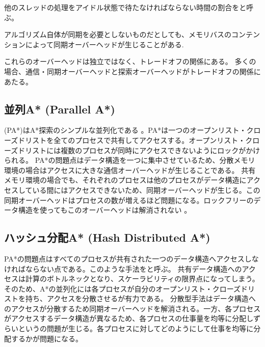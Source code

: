 {
  他のスレッドの処理をアイドル状態で待たなければならない時間の割合をと呼ぶ。
}

アルゴリズム自体が同期を必要としないものだとしても、メモリバスのコンテンションによって同期オーバーヘッドが生じることがある\cite{burnslrz10,kishimotofb13}.


これらのオーバーヘッドは独立ではなく、トレードオフの関係にある。
多くの場合、通信・同期オーバーヘッドと探索オーバーヘッドがトレードオフの関係にあたる。


\subsection{並列A* (Parallel A*)}

 (PA*)はA*探索のシンプルな並列化である \cite{iranis86}。PA*は一つのオープンリスト・クローズドリストを全てのプロセスで共有してアクセスする。オープンリスト・クローズドリストには複数のプロセスが同時にアクセスできないようにロックがかけられる。
PA*の問題点はデータ構造を一つに集中させているため、分散メモリ環境の場合はアクセスに大きな通信オーバーヘッドが生じることである。
共有メモリ環境の場合でも、それぞれのプロセスは他のプロセスがデータ構造にアクセスしている間にはアクセスできないため、同期オーバーヘッドが生じる。この同期オーバーヘッドはプロセスの数が増えるほど問題になる。ロックフリーのデータ構造を使ってもこのオーバーヘッドは解消されない \cite{burnslrz10}。

\subsection{ハッシュ分配A* (Hash Distributed A*)}
\label{sec:hash-distributed-astar}

PA*の問題点はすべてのプロセスが共有された一つのデータ構造へアクセスしなければならない点である。このような手法をと呼ぶ。
共有データ構造へのアクセスは計算のボトルネックとなり、スケーラビリティの限界点になってしまう。
そのため、A*の並列化には各プロセスが自分のオープンリスト・クローズドリストを持ち、アクセスを分散させるが有力である。
分散型手法はデータ構造へのアクセスが分散するため同期オーバーヘッドを解消される。一方、各プロセスがアクセスするデータ構造が異なるため、各プロセスの仕事量を均等に分配しずらいというの問題が生じる。各プロセスに対してどのようにして仕事を均等に分配するかが問題になる。

